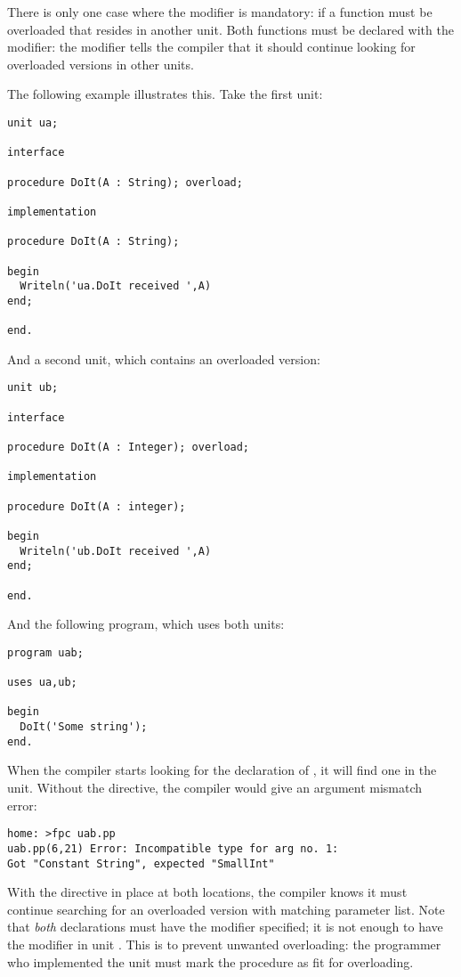 There is only one case where the  modifier is mandatory:
if a function must be overloaded that resides in another unit. Both
functions must be declared with the  modifier: the
 modifier tells the compiler that it should continue
looking for overloaded versions in other units.

The following example illustrates this. Take the first unit:
\begin{verbatim}
unit ua;

interface

procedure DoIt(A : String); overload;

implementation

procedure DoIt(A : String);

begin
  Writeln('ua.DoIt received ',A)
end;

end.
\end{verbatim}
And a second unit, which contains an overloaded version:
\begin{verbatim}
unit ub;

interface

procedure DoIt(A : Integer); overload;

implementation

procedure DoIt(A : integer);

begin
  Writeln('ub.DoIt received ',A)
end;

end.
\end{verbatim}
And the following program, which uses both units:
\begin{verbatim}
program uab;

uses ua,ub;

begin
  DoIt('Some string');
end.
\end{verbatim}
When the compiler starts looking for the declaration of , it will
find one in the  unit. Without the  directive, the
compiler would give an argument mismatch error:
\begin{verbatim}
home: >fpc uab.pp
uab.pp(6,21) Error: Incompatible type for arg no. 1:
Got "Constant String", expected "SmallInt"
\end{verbatim}
With the  directive in place at both locations, the compiler
knows it must continue searching for an overloaded version with matching
parameter list. Note that {\em both} declarations must have the
 modifier specified; it is not enough to have the modifier in
unit . This is to prevent unwanted overloading: the programmer who
implemented the  unit must mark the procedure as fit for overloading.

